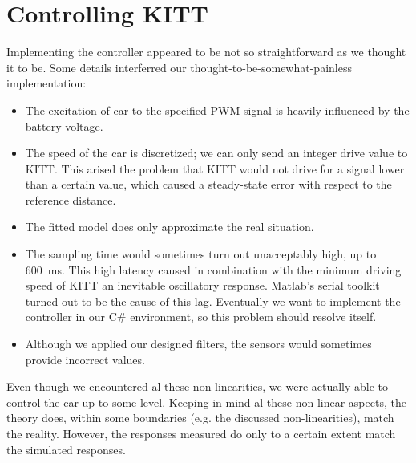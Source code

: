 \documentclass[11pt,titlepage]{report}
\begin{document}
\section{Controlling KITT}
Implementing the controller appeared to be not so straightforward as we thought it to be. Some details interferred our thought-to-be-somewhat-painless implementation:
\begin{itemize}
	\item The excitation of car to the specified PWM signal is heavily influenced by the battery voltage.
	\item The speed of the car is discretized; we can only send an integer drive value to KITT. This arised the problem that KITT would not drive for a signal lower than a certain value, which caused a steady-state error with respect to the reference distance.
	\item The fitted model does only approximate the real situation.
	\item The sampling time would sometimes turn out unacceptably high, up to \SI{600}{ms}. This high latency caused in combination with the minimum driving speed of KITT an inevitable oscillatory response. Matlab's serial toolkit turned out to be the cause of this lag. Eventually we want to implement the controller in our C\# environment, so this problem should resolve itself.
	\item Although we applied our designed filters, the sensors would sometimes provide incorrect values.
\end{itemize}
Even though we encountered al these non-linearities, we were actually able to control the car up to some level. Keeping in mind al these non-linear aspects, the theory does, within some boundaries (e.g. the discussed non-linearities), match the reality. However, the responses measured do only to a certain extent match the simulated responses.
\end{document}
